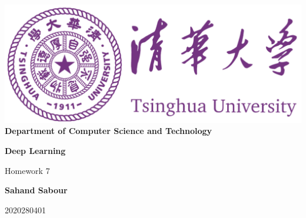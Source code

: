 \documentclass[12pt,a4paper]{article}
\begin{document}
	\begin{titlepage}
		\begin{center}
			\includegraphics[scale=.4]{Figures/Cover}\\
			\vspace{1cm}
			\bf{ \large {Department of Computer Science and Technology} }
		\end{center}
		
		\vspace{4cm}
		\centering
		\textbf{\Huge Deep Learning}
		\vspace{.5cm}
		
		{\Large Homework 7}

		\vspace{4cm}
		
		\textbf{\LARGE Sahand Sabour}
		
		
		
		\vspace{0.5cm}
		
		{\large 2020280401}
		
		
		\vfill
		
	\end{titlepage}
\end{document}
